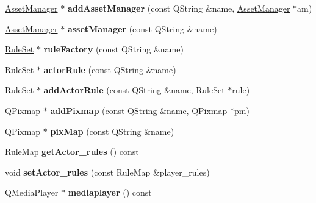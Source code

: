 \begin{DoxyCompactItemize}
\hyperlink{class_asset_manager}{Asset\+Manager} $\ast$ {\bfseries add\+Asset\+Manager} (const Q\+String \&name, \hyperlink{class_asset_manager}{Asset\+Manager} $\ast$am)
\item 
\mbox{\label{classmfg_1_1_engine_a2add7951cfef6093f77d07c7780d4def}} 
\hyperlink{class_asset_manager}{Asset\+Manager} $\ast$ {\bfseries asset\+Manager} (const Q\+String \&name)
\item 
\mbox{\label{classmfg_1_1_engine_a57372977f9e802e67a9f7bce0cd983e7}} 
\hyperlink{class_rule_set}{Rule\+Set} $\ast$ {\bfseries rule\+Factory} (const Q\+String \&name)
\item 
\mbox{\label{classmfg_1_1_engine_a3bd604d0698f7e72c38051cdeaff10d2}} 
\hyperlink{class_rule_set}{Rule\+Set} $\ast$ {\bfseries actor\+Rule} (const Q\+String \&name)
\item 
\mbox{\label{classmfg_1_1_engine_a3a06b7886658de0da68ca942a0b837b0}} 
\hyperlink{class_rule_set}{Rule\+Set} $\ast$ {\bfseries add\+Actor\+Rule} (const Q\+String \&name, \hyperlink{class_rule_set}{Rule\+Set} $\ast$rule)
\item 
\mbox{\label{classmfg_1_1_engine_a2467edce40ee2d41b688d047df2396b0}} 
Q\+Pixmap $\ast$ {\bfseries add\+Pixmap} (const Q\+String \&name, Q\+Pixmap $\ast$pm)
\item 
\mbox{\label{classmfg_1_1_engine_ad212205e8b53041f1284013ff4a7eacb}} 
Q\+Pixmap $\ast$ {\bfseries pix\+Map} (const Q\+String \&name)
\item 
\mbox{\label{classmfg_1_1_engine_a6ef9267c4fc390f42ae27baef1c6f701}} 
Rule\+Map {\bfseries get\+Actor\+\_\+rules} () const
\item 
\mbox{\label{classmfg_1_1_engine_aacf5e27746b15291536e0573cfc4e415}} 
void {\bfseries set\+Actor\+\_\+rules} (const Rule\+Map \&player\+\_\+rules)
\item 
\mbox{\label{classmfg_1_1_engine_af4126c00eb8ac07bd8bc56f67f4b0890}} 
Q\+Media\+Player $\ast$ {\bfseries mediaplayer} () const

\end{DoxyCompactItemize}
